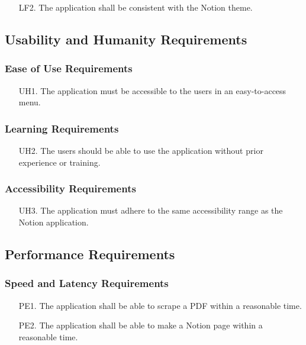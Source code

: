 \documentclass[12pt, titlepage]{article}
\begin{document}
\begin{itemize}
  \item[LF2.] The application shall be consistent with the Notion theme. 
\end{itemize}

\subsection{Usability and Humanity Requirements}

\subsubsection{Ease of Use Requirements}

\begin{itemize}
  \item[UH1.] The application must be accessible to the users in an easy-to-access menu.
\end{itemize}

\subsubsection{ Learning Requirements}

\begin{itemize}
  \item[UH2.] The users should be able to use the application without prior experience or training.
\end{itemize}

\subsubsection{Accessibility Requirements}

\begin{itemize}
  \item[UH3.] The application must adhere to the same accessibility range as the Notion application. 
\end{itemize}

\subsection{Performance Requirements}

\subsubsection{Speed and Latency Requirements}

\begin{itemize}
  \item[PE1.] The application shall be able to scrape a PDF within a reasonable time. 
  \item[PE2.] The application shall be able to make a Notion page within a reasonable time. 
\end{itemize}
\end{document}
